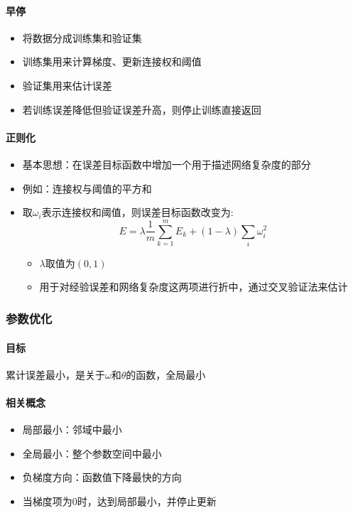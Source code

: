 \documentclass[UTF8]{ctexart}
\begin{document}
\paragraph{早停}
\begin{itemize}
	\item 将数据分成训练集和验证集
    \item 训练集用来计算梯度、更新连接权和阈值
    \item 验证集用来估计误差
    \item 若训练误差降低但验证误差升高，则停止训练直接返回
\end{itemize}
\paragraph{正则化}
\begin{itemize}
	\item 基本思想：在误差目标函数中增加一个用于描述网络复杂度的部分
	\item 例如：连接权与阈值的平方和
	\item 取$\omega_i$表示连接权和阈值，则误差目标函数改变为:
	$$E = \lambda\frac{1}{m}\sum_{k=1}^mE_k + (1-\lambda)\sum_i\omega_i^2$$ \begin{itemize}
		\item $\lambda$取值为$(0,1)$
		\item 用于对经验误差和网络复杂度这两项进行折中，通过交叉验证法来估计
	\end{itemize}
\end{itemize}

\subsubsection{参数优化}
\paragraph{目标}
累计误差最小，是关于$\omega$和$\theta$的函数，全局最小
\paragraph{相关概念}
\begin{itemize}
	\item 局部最小：邻域中最小
	\item 全局最小：整个参数空间中最小
	\item 负梯度方向：函数值下降最快的方向
	\item 当梯度项为0时，达到局部最小，并停止更新
\end{itemize}
\end{document}

